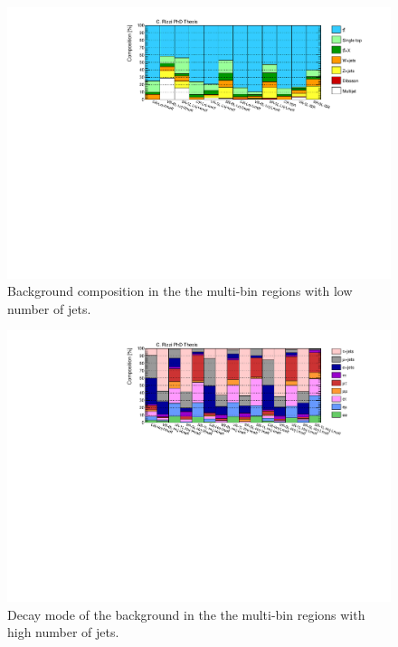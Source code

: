 \begin{figure}[htbp]
\includegraphics[width=\textwidth]{figures/strong_prod/comp_plots/Lnj_bkg.pdf}
\caption{Background composition in the the multi-bin regions with low number of jets.}
	\label{fig:bkgcomp_Lnj}
\end{figure}



\begin{figure}[htbp]
\includegraphics[width=\textwidth]{figures/strong_prod/comp_plots/Hnj_tt.pdf}
\caption{Decay mode of the \ttbar background in the the multi-bin regions with high number of jets.}
	\label{fig:ttcomp_Hnj}
\end{figure}

